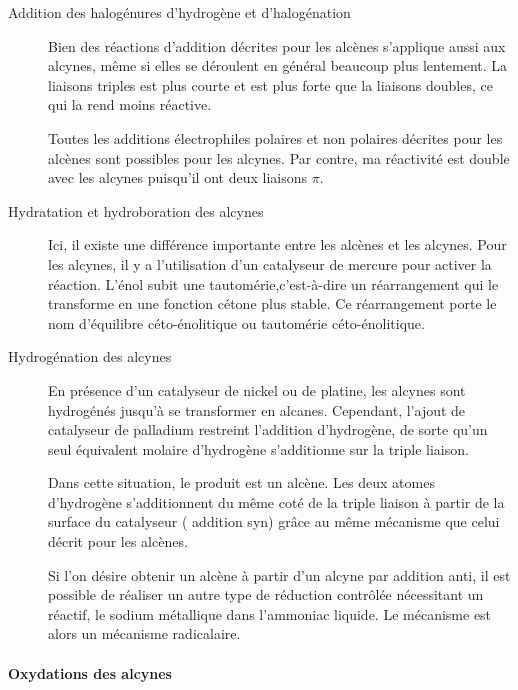 \begin{description}
  \item[Addition des halogénures d'hydrogène et d'halogénation]

    Bien des réactions d'addition décrites pour les alcènes s'applique aussi aux alcynes, même si elles se déroulent en général beaucoup plus lentement.
    La liaisons triples est plus courte et est plus forte que la liaisons doubles, ce qui la rend moins réactive.

    Toutes les additions électrophiles polaires et non polaires décrites pour les alcènes sont possibles pour les alcynes.
    Par contre, ma réactivité est double avec les alcynes puisqu'il ont deux liaisons $\pi$.


  \item[Hydratation et hydroboration des alcynes]

    Ici, il existe une différence importante entre les alcènes et les alcynes.
    Pour les alcynes, il y a l'utilisation d'un catalyseur de mercure pour activer la réaction.
    L'énol subit une tautomérie,c'est-à-dire un réarrangement qui le transforme en une fonction cétone plus stable.
    Ce réarrangement porte le nom d'équilibre céto-énolitique ou tautomérie céto-énolitique.

  \item[Hydrogénation des alcynes]

    En présence d'un catalyseur de nickel ou de platine, les alcynes sont hydrogénés jusqu'à se transformer en alcanes.
    Cependant, l'ajout de catalyseur de palladium restreint l'addition d'hydrogène, de sorte qu'un seul équivalent molaire d'hydrogène s'additionne sur la triple liaison.

    Dans cette situation, le produit est un alcène.
    Les deux atomes d'hydrogène s'additionnent du même coté de la triple liaison à partir de la surface du catalyseur ( addition syn) grâce au même mécanisme que celui décrit pour les alcènes.

    Si l'on désire obtenir un alcène à partir d'un alcyne par addition anti, il est possible de réaliser un autre type de réduction contrôlée nécessitant un réactif, le sodium métallique dans l'ammoniac liquide.
    Le mécanisme est alors un mécanisme radicalaire.

\end{description}


\paragraph{Oxydations des alcynes}


